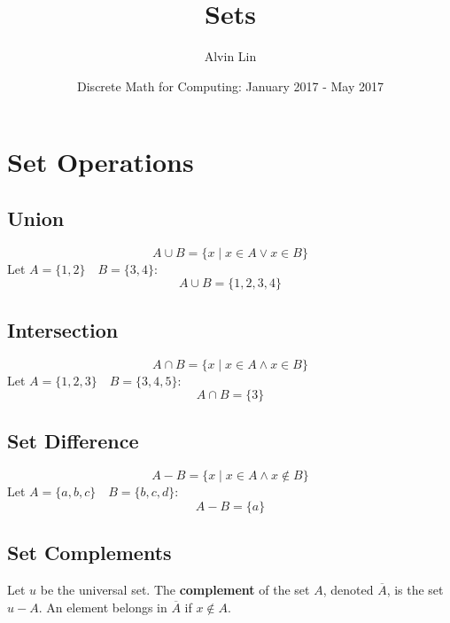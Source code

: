 \documentclass[letterpaper, 12pt]{math}
\title{Sets}
\author{Alvin Lin}
\date{Discrete Math for Computing: January 2017 - May 2017}
\begin{document}
\maketitle

\section*{Set Operations}

\subsection*{Union}
\[ A \cup B = \{x\mid x \in A \vee x \in B\} \]
Let \( A = \{1,2\} \quad B = \{3,4\} \):
\[ A \cup B = \{1,2,3,4\} \]

\subsection*{Intersection}
\[ A \cap B = \{x\mid x \in A \wedge x \in B\} \]
Let \( A = \{1,2,3\} \quad B = \{3,4,5\} \):
\[ A \cap B = \{3\} \]

\subsection*{Set Difference}
\[ A-B = \{x\mid x \in A \wedge x \notin B\} \]
Let \( A = \{a,b,c\} \quad B = \{b,c,d\} \):
\[ A-B = \{a\} \]

\subsection*{Set Complements}
Let \( u \) be the universal set. The \textbf{complement} of the set \( A \),
denoted \( \overline{A} \), is the set \( u-A \). An element belongs in \( \overline{A} \)
if \( x \notin A \).
\end{document}
